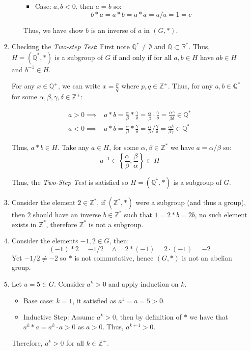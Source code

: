 \documentclass[a4paper, 11pt]{article}
\newcommand{\ZZ}{\mathbb{Z}}
\newcommand{\QQ}{\mathbb{Q}}
\newcommand{\RR}{\mathbb{R}}
\def\set#1{\left\{ #1 \right\}}
\begin{document}
\begin{enumerate}[label=(\alph*)]
\begin{itemize}
\begin{itemize}
				\item
				Case: $a,b<0$, then $a=b$ so:
				$$
					b*a = a*b = a*a = a/a = 1 = e 
				$$
			\end{itemize}

			Thus, we have show $b$ is an inverse of $a$ in $(G,*)$.
		\end{itemize}
	\item 
	Checking the \textit{Two-step Test}: First note $\QQ^*\neq \emptyset$ and $\QQ\subset\RR^*$. Thus, $H=(\QQ^*,*)$ is a subgroup of $G$ if and only if for all $a,b\in H$ have $ab\in H$ and $b^{-1}\in H$.  
	
	For any $x\in \QQ^+$, we can write $x=\frac pq$ where $p,q\in\ZZ^+$. Thus, for any $a,b\in\QQ^*$ for some $\alpha,\beta,\gamma,\delta \in \ZZ^+$: 

	\begin{align*}
		a > 0 \implies & a*b 
		= \frac \alpha\beta * \frac \gamma\delta 
		= \frac \alpha\beta \cdot \frac \gamma\delta
		= \frac {\alpha\gamma}{\beta\delta}\in\QQ^* \\
		a < 0 \implies & a*b 
		= \frac \alpha\beta * \frac \gamma\delta 
		= \frac \alpha\beta / \frac \gamma\delta  
		= \frac {\alpha\delta}{\beta\gamma} \in\QQ^*  
	\end{align*}		
	
	Thus, $a*b\in H$. Take any $a\in H$, for some $\alpha,\beta\in\ZZ^*$ we have $a=\alpha/\beta$ so:
	\[
		 a^{-1}\in\set{
			\frac\alpha\beta,
			\frac\beta\alpha
		}\subset H 
	\]

	Thus, the \textit{Two-Step Test} is satisfied so $H=(\QQ^*,*)$ is a subgroup of $G$. 

	\item 
	Consider the element $2\in\ZZ^*$, if $(\ZZ^*, *)$ were a subgroup (and thus a group), then $2$ should have an inverse $b\in\ZZ^*$ such that $1=2*b=2b$, no such element exists in $\ZZ^*$, therefore $\ZZ^*$ is not a subgroup.  

	\item 
	Consider the elements $-1,2 \in G$, then: 
	\[
		(-1) * 2 = -1/2  \quad \land \quad 2 * (-1) = 2 \cdot (-1) = -2 	
	\]
	Yet $-1/2 \neq -2$ so $*$ is not commutative, hence $(G,*)$ is not an abelian group. 

	\item 
	Let $a=5\in G$. Consider $a^k>0$ and apply induction on $k$. 
	\begin{itemize}
		\item Base case: $k=1$, it satisfied as $a^1=a=5>0$. 
		\item Inductive Step: Assume $a^k>0$, then by definition of $*$ we have that $a^k * a = a^k \cdot a > 0$ as $a>0$. Thus, $a^{k+1}>0$. 
	\end{itemize}
	Therefore, $a^k>0$ for all $k\in\ZZ^+$. 		


\end{enumerate}
\end{document}

